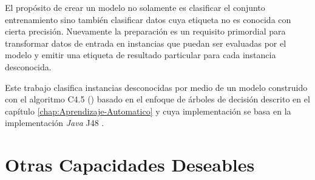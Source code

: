 El propósito de crear un modelo no solamente es clasificar el conjunto
entrenamiento sino también clasificar datos cuya etiqueta no es conocida
con cierta precisión. Nuevamente la preparación es un requisito primordial
para transformar datos de entrada en instancias que puedan ser evaluadas
por el modelo y emitir una etiqueta de resultado particular para cada
instancia desconocida.

Este trabajo clasifica instancias desconocidas por medio de un modelo
construido con el algoritmo C4.5 () basado en el
enfoque de árboles de decisión descrito en el capítulo \ref{chap:Aprendizaje-Automatico}
y cuya implementación se basa en la implementación \emph{Java} J48
\cite{Frank2016b}.

\section{Otras Capacidades Deseables}

